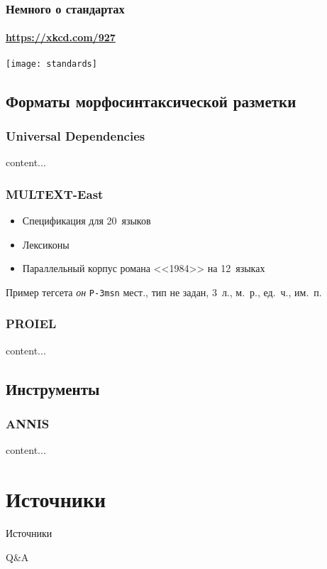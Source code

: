\begin{frame}
    \frametitle{Немного о стандартах}
    \framesubtitle{\url{https://xkcd.com/927}}
    \centering
    \texttt{[image: standards]}
\end{frame}

\subsection{Форматы морфосинтаксической разметки}


\begin{frame}
    \frametitle{Universal Dependencies}
    content...
\end{frame}

\begin{frame}
    \frametitle{MULTEXT-East}

    \begin{itemize}
        \item Спецификация для 20~языков \autocite{erjavec:2021}
        \item Лексиконы
        \item Параллельный корпус романа <<1984>> на 12~языках
    \end{itemize}

    \vfill

    \begin{block}{Пример тегсета}
        \textit{он} \linebreak \texttt{P-3msn} \linebreak мест., тип не задан, 3~л., м.~р., ед.~ч., им.~п.
    \end{block}
\end{frame}

\begin{frame}
    \frametitle{PROIEL}
    content...
\end{frame}

\subsection{Инструменты}


\begin{frame}
    \frametitle{ANNIS}
    content...
\end{frame}


\section{Источники}

\frame{\tableofcontents[currentsection]}

\begin{frame}{Источники}
    \nocite{*}
    \printbibliography
\end{frame}

\begin{frame}{}
    \centering

    \vfill
    Q\&A
    \vfill
\end{frame}


